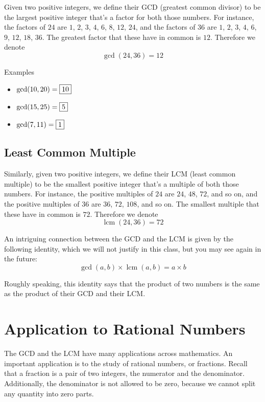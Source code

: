 \documentclass[a4paper,10pt]{report}
\begin{document}
Given two positive integers, we define their GCD (greatest common divisor) to be
the largest positive integer that's a factor for both those numbers. For
instance, the factors of $24$ are $1$, $2$, $3$, $4$, $6$, $8$, $12$, $24$, and
the factors of $36$ are $1$, $2$, $3$, $4$, $6$, $9$, $12$, $18$, $36$. The
greatest factor that these have in common is $12$. Therefore we denote \[
 \gcd(24, 36) = 12
\]

\begin{problem}{Examples}
 \begin{itemize}
  \item $\gcd(10, 20) = \Ans{10}$
  \item $\gcd(15, 25) = \Ans{5}$
  \item $\gcd(7, 11) = \Ans{1}$
 \end{itemize}
\end{problem}

\subsection{Least Common Multiple}
Similarly, given two positive integers, we define their LCM (least common
multiple) to be the smallest positive integer that's a multiple of both those
numbers. For instance, the positive multiples of $24$ are $24$, $48$, $72$, and
so on, and the positive multiples of $36$ are $36$, $72$, $108$, and so on.
The smallest multiple that these have in common is $72$. Therefore we
denote \[
 \operatorname{lcm}(24, 36) = 72
\]

An intriguing connection between the GCD and the LCM is given by the following
identity, which we will not justify in this class, but you may see again in the
future: \[
 \gcd(a, b) \times \operatorname{lcm}(a, b) = a \times b
\]

Roughly speaking, this identity says that the product of two numbers is the same
as the product of their GCD and their LCM.

\section{Application to Rational Numbers}

The GCD and the LCM have many applications across mathematics. An important
application is to the study of rational numbers, or fractions. Recall that a
fraction is a pair of two integers, the numerator and the denominator.
Additionally, the denominator is not allowed to be zero, because we cannot split
any quantity into zero parts.
\end{document}
